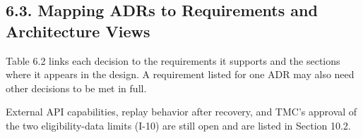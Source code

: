 \subsection*{6.3. Mapping ADRs to Requirements and Architecture Views}

{}


Table 6.2 links each decision to the requirements it supports and the sections where it appears in the design. A requirement listed for one ADR may also need other decisions to be met in full.

External API capabilities, replay behavior after recovery, and TMC's approval of the two eligibility-data limits (I-10) are still open and are listed in Section 10.2.

